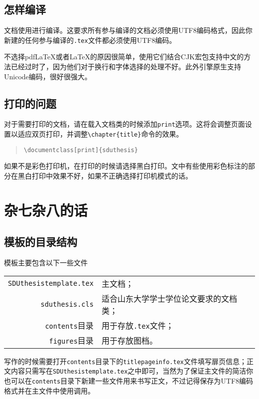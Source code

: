 \section{怎样编译}
\label{section:howtocompile}
文档使用\XeLaTeX{}进行编译。这要求所有参与编译的文档必须使用UTF8编码格式，因此你新建的任何参与编译的\texttt{.tex}文件都必须使用UTF8编码。

不选择pdf\LaTeX{}或者\LaTeX{}的原因很简单，使用它们结合CJK宏包支持中文的方法已经过时了，因为他们对于换行和字体选择的处理不好。此外\XeTeX{}引擎原生支持Unicode编码，很好很强大。
\section{打印的问题}
对于需要打印的文档，请在载入文档类的时候添加\texttt{print}选项。这将会调整页面设置以适应双页打印，并调整\verb|\chapter{title}|命令的效果。
\begin{quote}
\begin{verbatim}
\documentclass[print]{sduthesis}
\end{verbatim}
\end{quote}

如果不是彩色打印机，在打印的时候请选择黑白打印。文中有些使用彩色标注的部分在黑白打印中效果不好，如果不正确选择打印机模式的话。
\chapter{杂七杂八的话}
\section{模板的目录结构}
模板主要包含以下一些文件
\begin{center}
\begin{tabular}
{rl}
\toprule
\texttt{SDUthesistemplate.tex}& 主文档；\\
\texttt{sduthesis.cls}& 适合山东大学学士学位论文要求的文档类；\\
\texttt{contents}目录& 用于存放\texttt{.tex}文件；\\
\texttt{figures}目录& 用于存放图档。\\
\bottomrule
\end{tabular}
\end{center}

写作的时候需要打开\texttt{contents}目录下的\texttt{titlepageinfo.tex}文件填写扉页信息；正文内容只需写在\texttt{SDUthesistemplate.tex}之中即可，当然为了保证主文件的简洁你也可以在\texttt{contents}目录下新建一些文件用来书写正文，不过记得保存为UTF8编码格式并在主文件中使用\verb||调用。
